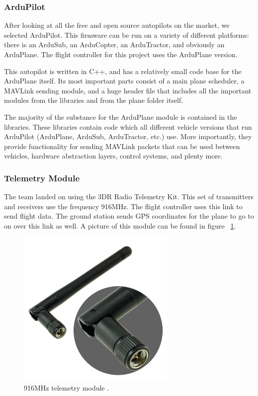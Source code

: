 \documentclass[12pt,journal,compsoc]{IEEEtran}
\begin{document}
\subsubsection{ArduPilot}
After looking at all the free and open source autopilots on the market, we selected ArduPilot. This firmware can be run on a variety of different platforms: there is an ArduSub, an ArduCopter, an ArduTractor, and obviously an ArduPlane. The flight controller for this project uses the ArduPlane version. 

This autopilot is written in C++, and has a relatively small code base for the ArduPlane itself. Its most important parts consist of a main plane scheduler, a MAVLink sending module, and a huge header file that includes all the important modules from the libraries and from the plane folder itself. 

The majority of the substance for the ArduPlane module is contained in the libraries. These libraries contain code which all different vehicle versions that run ArduPilot (ArduPlane, ArduSub, ArduTractor, etc.) use. More importantly, they provide functionality for sending MAVLink packets that can be used between vehicles, hardware abstraction layers, control systems, and plenty more. 

\subsubsection{Telemetry Module}
The team landed on using the 3DR Radio Telemetry Kit. This set of transmitters and receivers use the frequency 916MHz. The flight controller uses this link to send flight data. The ground station sends GPS coordinates for the plane to go to on over this link as well. A picture of this module can be found in figure ~\ref{mavStruct}.

\begin{figure}[h!]
\hspace*{0cm}
\centering
\includegraphics[width=3in]{telemmodule.jpg}

\caption{916MHz telemetry module \cite{telemModule}.}

\label{mavStruct}
\end{figure}
\end{document}
